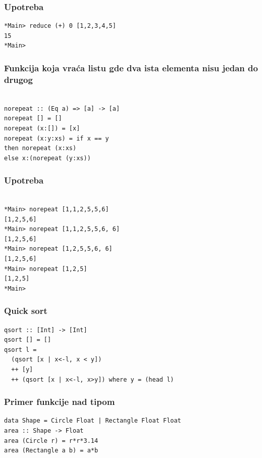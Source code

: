 \documentclass{beamer}
\begin{document}
\begin{frame}[fragile]
  \frametitle{Upotreba}
  \begin{lstlisting}
*Main> reduce (+) 0 [1,2,3,4,5]
15
*Main> 
  \end{lstlisting}
\end{frame}

\begin{frame}[fragile]
  \frametitle{Funkcija koja vraća listu gde dva ista elementa nisu jedan do drugog} 
  \begin{lstlisting}

norepeat :: (Eq a) => [a] -> [a]
norepeat [] = [] 
norepeat (x:[]) = [x]
norepeat (x:y:xs) = if x == y 
then norepeat (x:xs) 
else x:(norepeat (y:xs))

  \end{lstlisting}
\end{frame}
    

\begin{frame}[fragile]
  \frametitle{Upotreba}
  \begin{lstlisting}

*Main> norepeat [1,1,2,5,5,6]
[1,2,5,6]
*Main> norepeat [1,1,2,5,5,6, 6]
[1,2,5,6]
*Main> norepeat [1,2,5,5,6, 6]
[1,2,5,6]
*Main> norepeat [1,2,5]
[1,2,5]
*Main>

  \end{lstlisting}
\end{frame}


\begin{frame}[fragile]
  \frametitle{Quick sort}
  \begin{lstlisting}
qsort :: [Int] -> [Int]
qsort [] = []
qsort l = 
  (qsort [x | x<-l, x < y]) 
  ++ [y] 
  ++ (qsort [x | x<-l, x>y]) where y = (head l)
  \end{lstlisting}
\end{frame}
    


\begin{frame}[fragile]
  \frametitle{Primer funkcije nad tipom}
  \begin{lstlisting}
data Shape = Circle Float | Rectangle Float Float 
area :: Shape -> Float 
area (Circle r) = r*r*3.14
area (Rectangle a b) = a*b
  \end{lstlisting}
\end{frame}
    
\end{document}
